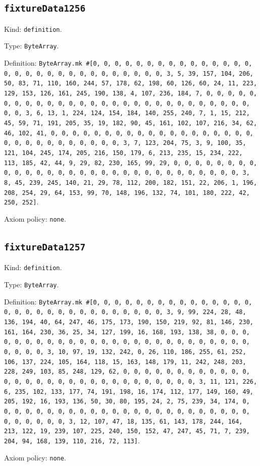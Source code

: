 \documentclass[11pt]{article}
\begin{document}
\subsection*{\texttt{fixtureData1256}}
\noindent Kind: \texttt{definition}.\par
\noindent Type: \texttt{ByteArray}.\par
\noindent Definition: \texttt{ByteArray.mk \#[0, 0, 0, 0, 0, 0, 0, 0, 0, 0, 0, 0, 0, 0, 0, 0, 0, 0, 0, 0, 0, 0, 0, 0, 0, 0, 0, 0, 0, 0, 3, 5, 39, 157, 104, 206, 50, 83, 71, 110, 160, 244, 57, 178, 62, 198, 60, 126, 60, 24, 11, 223, 129, 153, 126, 161, 245, 190, 138, 4, 107, 236, 184, 7, 0, 0, 0, 0, 0, 0, 0, 0, 0, 0, 0, 0, 0, 0, 0, 0, 0, 0, 0, 0, 0, 0, 0, 0, 0, 0, 0, 0, 0, 0, 3, 6, 13, 1, 224, 124, 154, 184, 140, 255, 240, 7, 1, 15, 212, 45, 59, 71, 191, 205, 35, 19, 182, 90, 45, 161, 102, 107, 216, 34, 62, 46, 102, 41, 0, 0, 0, 0, 0, 0, 0, 0, 0, 0, 0, 0, 0, 0, 0, 0, 0, 0, 0, 0, 0, 0, 0, 0, 0, 0, 0, 0, 0, 0, 3, 7, 123, 204, 75, 3, 9, 100, 35, 121, 104, 245, 174, 205, 216, 150, 179, 6, 213, 235, 15, 234, 222, 113, 185, 42, 44, 9, 29, 82, 230, 165, 99, 29, 0, 0, 0, 0, 0, 0, 0, 0, 0, 0, 0, 0, 0, 0, 0, 0, 0, 0, 0, 0, 0, 0, 0, 0, 0, 0, 0, 0, 0, 0, 3, 8, 45, 239, 245, 140, 21, 29, 78, 112, 200, 182, 151, 22, 206, 1, 196, 208, 254, 29, 64, 153, 99, 70, 148, 196, 132, 74, 101, 180, 222, 42, 250, 252]}.\par
\noindent Axiom policy: \texttt{none}.\par
\subsection*{\texttt{fixtureData1257}}
\noindent Kind: \texttt{definition}.\par
\noindent Type: \texttt{ByteArray}.\par
\noindent Definition: \texttt{ByteArray.mk \#[0, 0, 0, 0, 0, 0, 0, 0, 0, 0, 0, 0, 0, 0, 0, 0, 0, 0, 0, 0, 0, 0, 0, 0, 0, 0, 0, 0, 0, 0, 3, 9, 99, 224, 28, 48, 136, 194, 40, 64, 247, 46, 175, 173, 190, 150, 219, 92, 81, 146, 230, 161, 164, 230, 36, 25, 34, 127, 199, 16, 168, 193, 138, 38, 0, 0, 0, 0, 0, 0, 0, 0, 0, 0, 0, 0, 0, 0, 0, 0, 0, 0, 0, 0, 0, 0, 0, 0, 0, 0, 0, 0, 0, 0, 3, 10, 97, 19, 132, 242, 0, 26, 110, 186, 255, 61, 252, 106, 137, 224, 105, 164, 118, 15, 163, 148, 179, 11, 242, 248, 203, 228, 249, 103, 85, 248, 129, 62, 0, 0, 0, 0, 0, 0, 0, 0, 0, 0, 0, 0, 0, 0, 0, 0, 0, 0, 0, 0, 0, 0, 0, 0, 0, 0, 0, 0, 0, 0, 3, 11, 121, 226, 6, 235, 102, 133, 177, 74, 191, 198, 16, 174, 112, 177, 149, 160, 49, 205, 192, 16, 193, 136, 50, 30, 80, 195, 24, 2, 75, 239, 34, 174, 0, 0, 0, 0, 0, 0, 0, 0, 0, 0, 0, 0, 0, 0, 0, 0, 0, 0, 0, 0, 0, 0, 0, 0, 0, 0, 0, 0, 0, 0, 3, 12, 107, 47, 18, 135, 61, 143, 178, 244, 164, 213, 122, 19, 239, 107, 225, 240, 150, 152, 47, 247, 45, 71, 7, 239, 204, 94, 168, 139, 110, 216, 72, 113]}.\par
\noindent Axiom policy: \texttt{none}.\par
\end{document}
